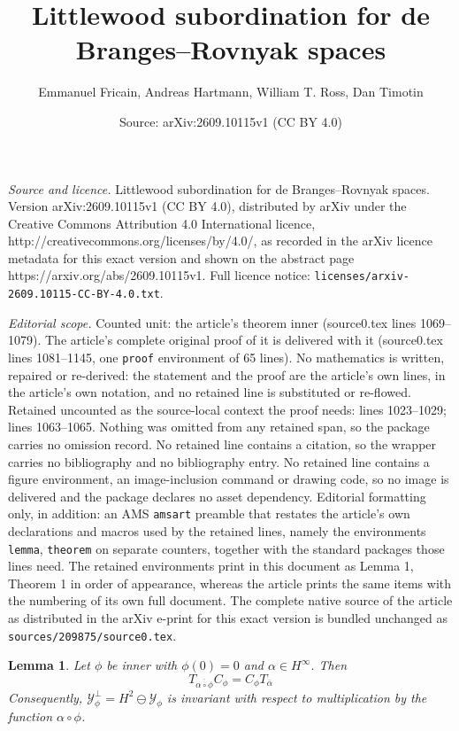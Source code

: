 \documentclass[10pt,a4paper]{amsart}
\title{Littlewood subordination for de Branges--Rovnyak spaces}
\author{Emmanuel Fricain, Andreas Hartmann, William T. Ross, Dan Timotin}
\date{Source: arXiv:2609.10115v1 (CC BY 4.0)}
\newtheorem{lemma}{Lemma}
\def\YY{{\mathcal Y}}
\begin{document}
\maketitle

\noindent\emph{Source and licence.} Littlewood subordination for de Branges--Rovnyak spaces. Version arXiv:2609.10115v1 (CC BY 4.0), distributed by arXiv under the Creative Commons Attribution 4.0 International licence, http://creativecommons.org/licenses/by/4.0/, as recorded in the arXiv licence metadata for this exact version and shown on the abstract page https://arxiv.org/abs/2609.10115v1. Full licence notice: \texttt{licenses/arxiv-2609.10115-CC-BY-4.0.txt}.\par\smallskip

\noindent\textit{Editorial scope.} Counted unit: the article's theorem inner (source0.tex lines 1069--1079). The article's complete original proof of it is delivered with it (source0.tex lines 1081--1145, one \texttt{proof} environment of 65 lines). No mathematics is written, repaired or re-derived: the statement and the proof are the article's own lines, in the article's own notation, and no retained line is substituted or re-flowed.  Retained uncounted as the source-local context the proof needs: lines 1023--1029; lines 1063--1065.  Nothing was omitted from any retained span, so the package carries no omission record.  No retained line contains a citation, so the wrapper carries no bibliography and no bibliography entry.  No retained line contains a figure environment, an image-inclusion command or drawing code, so no image is delivered and the package declares no asset dependency.  Editorial formatting only, in addition: an AMS \texttt{amsart} preamble that restates the article's own declarations and macros used by the retained lines, namely the environments \texttt{lemma}, \texttt{theorem} on separate counters, together with the standard packages those lines need.  The retained environments print in this document as Lemma 1, Theorem 1 in order of appearance, whereas the article prints the same items with the numbering of its own full document.  The complete native source of the article as distributed in the arXiv e-print for this exact version is bundled unchanged as \texttt{sources/209875/source0.tex}.
\begin{lemma}\label{le:mistery identity}
	Let $\phi$ be inner with $\phi(0)=0$ and $\alpha\in H^\infty$. Then
	\begin{equation}\label{eq:mystery}
			T_{\overline{\alpha\circ\phi}}C_\phi=C_\phi T_{\overline\alpha}
	\end{equation}
Consequently, $\YY_\phi^\perp = H^2 \ominus \mathcal{Y}_{\phi}$ is invariant with respect to multiplication by the function $\alpha\circ\phi$.
\end{lemma}
\end{document}
